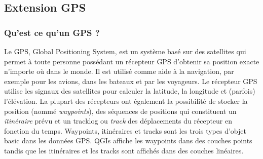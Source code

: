 
\subsection{Extension GPS}\label{label_plugingps}


\subsubsection{Qu'est ce qu'un GPS ?}\label{whatsgps}

Le GPS, Global Positioning System, est un système basé sur des satellites qui permet à toute personne possédant un récepteur GPS d'obtenir sa position exacte n'importe où dans le monde. Il est utilisé comme aide à la navigation, par exemple pour les avions, dans les bateaux et par les voyageurs.
Le récepteur GPS utilise les signaux des satellites pour calculer la latitude, la longitude et (parfois) l'élévation.
La plupart des récepteurs ont également la possibilité de stocker la position (nommé \emph{waypoints}), des séquences de positions qui constituent un
\emph{itinéraire} prévu et un tracklog ou \emph{track} des déplacements du récepteur en fonction du temps.
Waypoints, itinéraires et tracks sont les trois types d'objet basic dans les données GPS. QGIs affiche les waypoints dans des couches points tandis que les itinéraires et les tracks sont affichés dans des couches linéaires.

